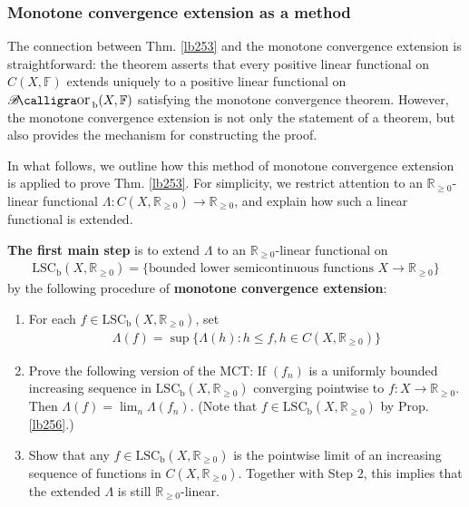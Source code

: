 \documentclass[12pt,b5paper,notitlepage]{article}
\theoremstyle{definition}
\theoremstyle{plain}
\DeclareMathOperator{\Borb}{{\mathscr{B}\text{\kern -2pt {\calligra\large or}}\,}_{\mathrm b}}
\newcommand{\Rbb}{\mathbb R}
\newcommand{\Fbb}{\mathbb F}
\newcommand{\LSCb}{\mathrm{LSC}_{\mathrm b}}
\numberwithin{equation}{section}
\begin{document}
\subsubsection{Monotone convergence extension as a method}


The connection between Thm. \ref{lb253} and the monotone convergence extension is straightforward: the theorem asserts that every positive linear functional on $C(X,\Fbb)$ extends uniquely to a positive linear functional on $\Borb(X,\Fbb)$ satisfying the monotone convergence theorem. However, the monotone convergence extension is not only the statement of a theorem, but also provides the mechanism for constructing the proof. 

In what follows, we outline how this method of monotone convergence extension is applied to prove Thm. \ref{lb253}. For simplicity, we restrict attention to an $\Rbb_{\geq0}$-linear functional $\Lambda:C(X,\Rbb_{\geq0})\rightarrow\Rbb_{\geq0}$, and explain how such a linear functional is extended.

\textbf{The first main step} is to extend $\Lambda$ to an $\Rbb_{\geq0}$-linear functional on \index{LSCb@$\LSCb(X,\Rbb_{\geq0})$}
\begin{align}\label{eq162}
\LSCb(X,\Rbb_{\geq0})=\{\text{bounded lower semicontinuous functions }X\rightarrow\Rbb_{\geq0}\}
\end{align}
by the following procedure of \textbf{monotone convergence extension}:
\begin{enumerate}[label=(\arabic*)]
\item For each $f\in\LSCb(X,\Rbb_{\geq0})$, set
\begin{align*}
\Lambda(f)=\sup\{\Lambda(h):h\leq f,h\in C(X,\Rbb_{\geq0})\}
\end{align*}
\item Prove the following version of the MCT: If $(f_n)$ is a uniformly bounded increasing sequence in $\LSCb(X,\Rbb_{\geq0})$ converging pointwise to $f:X\rightarrow\Rbb_{\geq0}$. Then $\Lambda(f)=\lim_n\Lambda(f_n)$. (Note that $f\in\LSCb(X,\Rbb_{\geq0})$ by Prop. \ref{lb256}.)
\item Show that any $f\in\LSCb(X,\Rbb_{\geq0})$ is the pointwise limit of an increasing sequence of functions in $C(X,\Rbb_{\geq0})$. Together with Step 2, this implies that the extended $\Lambda$ is still $\Rbb_{\geq0}$-linear.
\end{enumerate}
\end{document}
